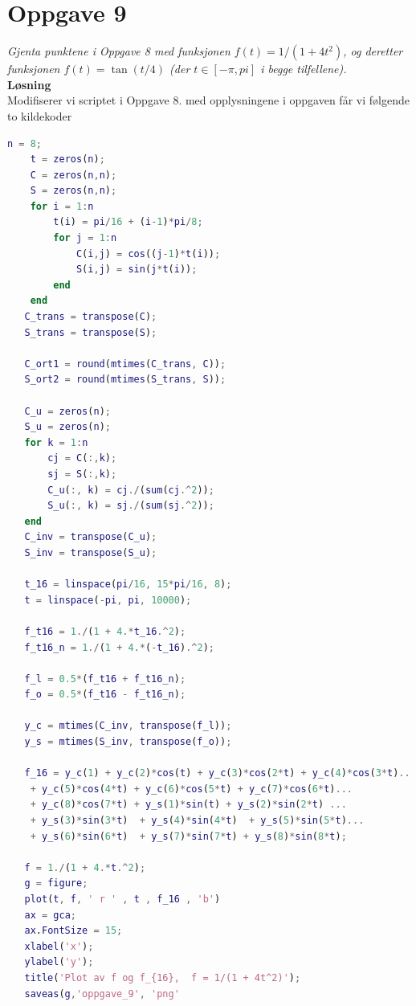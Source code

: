 \documentclass[12pt,
               a4paper,
               article,
               oneside,
               oldfontcommands,
               norsk]{memoir}
\begin{document}
\section*{Oppgave 9}
\emph{Gjenta punktene i Oppgave 8 med funksjonen $f(t)= 1/(1 + 4t^2)$, og deretter funksjonen $f(t) = \tan(t/4)$ (der $t \in [-\pi, pi]$ i begge tilfellene).}\vspace{3mm}\\
\textbf{Løsning}\vspace{3mm}\\
Modifiserer vi scriptet i Oppgave 8. med opplysningene i oppgaven får vi følgende to kildekoder
\begin{lstlisting}[language=MATLAB]
	 n = 8;
    t = zeros(n);
    C = zeros(n,n);
    S = zeros(n,n);
    for i = 1:n
        t(i) = pi/16 + (i-1)*pi/8;
        for j = 1:n
            C(i,j) = cos((j-1)*t(i));
            S(i,j) = sin(j*t(i));
        end
    end
   C_trans = transpose(C);
   S_trans = transpose(S);
   
   C_ort1 = round(mtimes(C_trans, C));
   S_ort2 = round(mtimes(S_trans, S));  
   
   C_u = zeros(n);
   S_u = zeros(n);
   for k = 1:n
       cj = C(:,k);
       sj = S(:,k);
       C_u(:, k) = cj./(sum(cj.^2));
       S_u(:, k) = sj./(sum(sj.^2));
   end
   C_inv = transpose(C_u);
   S_inv = transpose(S_u);
   
   t_16 = linspace(pi/16, 15*pi/16, 8);
   t = linspace(-pi, pi, 10000);
   
   f_t16 = 1./(1 + 4.*t_16.^2);
   f_t16_n = 1./(1 + 4.*(-t_16).^2);
   
   f_l = 0.5*(f_t16 + f_t16_n);
   f_o = 0.5*(f_t16 - f_t16_n);
   
   y_c = mtimes(C_inv, transpose(f_l));
   y_s = mtimes(S_inv, transpose(f_o));
   
   f_16 = y_c(1) + y_c(2)*cos(t) + y_c(3)*cos(2*t) + y_c(4)*cos(3*t)... 
    + y_c(5)*cos(4*t) + y_c(6)*cos(5*t) + y_c(7)*cos(6*t)... 
    + y_c(8)*cos(7*t) + y_s(1)*sin(t) + y_s(2)*sin(2*t) ...
    + y_s(3)*sin(3*t)  + y_s(4)*sin(4*t)  + y_s(5)*sin(5*t)... 
    + y_s(6)*sin(6*t)  + y_s(7)*sin(7*t) + y_s(8)*sin(8*t);

   f = 1./(1 + 4.*t.^2);
   g = figure;
   plot(t, f, ' r ' , t , f_16 , 'b')
   ax = gca;
   ax.FontSize = 15;
   xlabel('x');
   ylabel('y');
   title('Plot av f og f_{16},  f = 1/(1 + 4t^2)');
   saveas(g,'oppgave_9', 'png'
\end{lstlisting}
\end{document}
